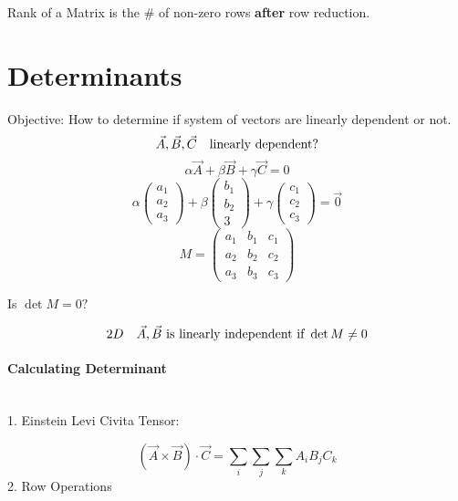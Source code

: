 \documentclass[svgnames]{article}   	%
\begin{document}
Rank of a Matrix is the \# of non-zero rows \textbf{after} row reduction. 


\section{Determinants}

Objective: How to determine if system of vectors are linearly dependent or
not. 
\[
  \vec{A}, \vec{B}, \vec{C} \hspace{10px} \text{linearly dependent?}
\] \vspace{5px} 
\[
\alpha \vec{A} + \beta \vec{B} + \gamma \vec{C} = 0  
\] \vspace{5px} 
\[
\alpha
\begin{pmatrix}
  a_1 \\ a_2\\ a_3
\end{pmatrix} + 
\beta
\begin{pmatrix}
  b_1 \\ b_2 \\ 3 
\end{pmatrix} + 
\gamma 
\begin{pmatrix}
  c_1 \\ c_2 \\ c_3 
\end{pmatrix} = \vec{0}
\] \vspace{5px} 
\[
M = \begin{pmatrix} 
  a_1 & b_1 & c_1  \\
  a_2 & b_2 & c_2 \\
  a_3 & b_3 & c_3  
\end{pmatrix} 
\] \vspace{5px} 

Is $\det M = 0?$

\[
 2D \hspace{10px} \vec{A}, \vec{B} \text{ is linearly independent if } \det M \neq 0 
\] \vspace{5px} 

\paragraph{Calculating Determinant} \mbox{} \\

1. Einstein Levi Civita Tensor: 

\[
  (\vec{A} \times \vec{B} ) \cdot \vec{C} = \sum_i \sum_j \sum_k A_i B_j C_k
\] \vspace{5px} 
2. Row Operations \mbox{} \\
\end{document}
